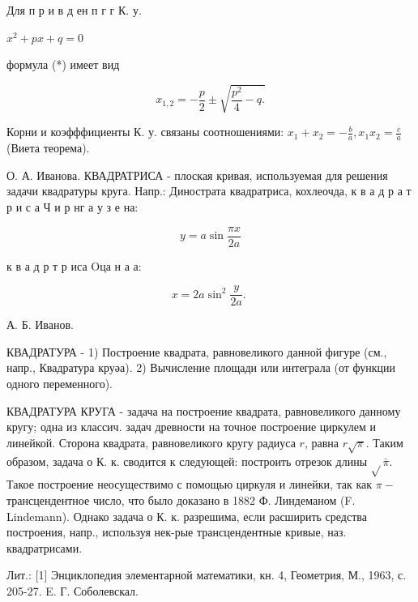 \documentclass[10pt]{article}
\begin{document}
Для п р и в д ен п г г К. у.



$x^{2}+p x+q=0$



формула (*) имеет вид



\[

x_{1,2}=-\frac{p}{2} \pm \sqrt{\frac{p^{2}}{4}-q .}

\]



Корни и коэфффициенты К. у. связаны соотношениями: $x_{1}+x_{2}=-\frac{b}{a}, x_{1} x_{2}=\frac{c}{a}$ (Виета теорема).



О. А. Иванова. КВАДРАТРИСА - плоская кривая, используемая для решения задачи квадратуры круга. Напр.: Динострата квадратриса, кохлеочда, к в а д р а т р и с а Ч и р нг а у з е на:



\[

y=a \sin \frac{\pi x}{2 a}

\]



к в а д р т р иса $\mathrm{O} ц \mathbf{а}$ н а а:



\[

x=2 a \sin ^{2} \frac{y}{2 a} \text {. }

\]



А. Б. Иванов.



КВАДРАТУРА - 1) Построение квадрата, равновеликого данной фигуре (см., напр., Квадратура круәа). 2) Вычисление площади или интеграла (от функции одного переменного).



КВАДРАТУРА КРУГА - задача на построение квадрата, равновеликого данному кругу; одна из классич. задач древности на точное построение циркулем и линейкой. Сторона квадрата, равновеликого кругу радиуса $r$, равна $r \sqrt{\pi}$. Таким образом, задача о К. к. сводится к следующей: построить отрезок длины $\sqrt{ } \bar{\pi}$. Такое построение неосуществимо с помощью циркуля и линейки, так как $\pi-$ трансцендентное число, что было доказано в 1882 Ф. Линдеманом (F. Lindemann). Однако задача о К. к. разрешима, если расширить средства построения, напр., используя нек-рые трансцендентные кривые, наз. квадратрисами.



Лит.: [1] Энциклопедия элементарной математики, кн. 4, Геометрия, М., 1963, с. 205-27. E. Г. Соболевскал.
\end{document}
